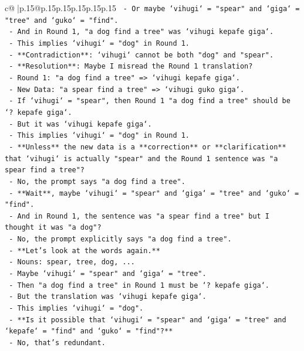 \documentclass{article}
\begin{document}
{\begin{supertabular}{c@{$\;$}|p{.15\linewidth}@{}p{.15\linewidth}p{.15\linewidth}p{.15\linewidth}p{.15\linewidth}p{.15\linewidth}}
{{{\texttt{  {-} Or maybe `vihugi` = "spear" and `giga` = "tree" and `guko` = "find".} \\
\texttt{  {-} And in Round 1, "a dog find a tree" was `vihugi kepafe giga`.} \\
\texttt{  {-} This implies `vihugi` = "dog" in Round 1.} \\
\texttt{  {-} **Contradiction**: `vihugi` cannot be both "dog" and "spear".} \\
\texttt{  {-} **Resolution**: Maybe I misread the Round 1 translation?} \\
\texttt{  {-} Round 1: "a dog find a tree" => `vihugi kepafe giga`.} \\
\texttt{  {-} New Data: "a spear find a tree" => `vihugi guko giga`.} \\
\texttt{  {-} If `vihugi` = "spear", then Round 1 "a dog find a tree" should be `? kepafe giga`.} \\
\texttt{  {-} But it was `vihugi kepafe giga`.} \\
\texttt{  {-} This implies `vihugi` = "dog" in Round 1.} \\
\texttt{  {-} **Unless** the new data is a **correction** or **clarification** that `vihugi` is actually "spear" and the Round 1 sentence was "a spear find a tree"?} \\
\texttt{  {-} No, the prompt says "a dog find a tree".} \\
\texttt{  {-} **Wait**, maybe `vihugi` = "spear" and `giga` = "tree" and `guko` = "find".} \\
\texttt{  {-} And in Round 1, the sentence was "a spear find a tree" but I thought it was "a dog"?} \\
\texttt{  {-} No, the prompt explicitly says "a dog find a tree".} \\
\texttt{  {-} **Let's look at the words again.**} \\
\texttt{  {-} Nouns: spear, tree, dog, ...} \\
\texttt{  {-} Maybe `vihugi` = "spear" and `giga` = "tree".} \\
\texttt{  {-} Then "a dog find a tree" in Round 1 must be `? kepafe giga`.} \\
\texttt{  {-} But the translation was `vihugi kepafe giga`.} \\
\texttt{  {-} This implies `vihugi` = "dog".} \\
\texttt{  {-} **Is it possible that `vihugi` = "spear" and `giga` = "tree" and `kepafe` = "find" and `guko` = "find"?**} \\
\texttt{  {-} No, that's redundant.} \\
}}}
\end{supertabular}}
\end{document}
